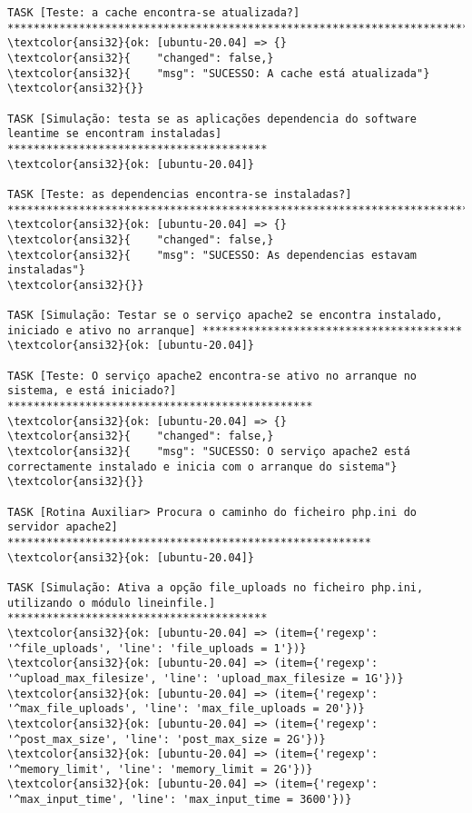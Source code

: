 \documentclass{scrartcl}
\begin{document}
\begin{Verbatim}
TASK [Teste: a cache encontra-se atualizada?] ********************************************************************************************
\textcolor{ansi32}{ok: [ubuntu-20.04] => {}
\textcolor{ansi32}{    "changed": false,}
\textcolor{ansi32}{    "msg": "SUCESSO: A cache está atualizada"}
\textcolor{ansi32}{}}

TASK [Simulação: testa se as aplicações dependencia do software leantime se encontram instaladas] ****************************************
\textcolor{ansi32}{ok: [ubuntu-20.04]}

TASK [Teste: as dependencias encontra-se instaladas?] ************************************************************************************
\textcolor{ansi32}{ok: [ubuntu-20.04] => {}
\textcolor{ansi32}{    "changed": false,}
\textcolor{ansi32}{    "msg": "SUCESSO: As dependencias estavam instaladas"}
\textcolor{ansi32}{}}

TASK [Simulação: Testar se o serviço apache2 se encontra instalado, iniciado e ativo no arranque] ****************************************
\textcolor{ansi32}{ok: [ubuntu-20.04]}

TASK [Teste: O serviço apache2 encontra-se ativo no arranque no sistema, e está iniciado?] ***********************************************
\textcolor{ansi32}{ok: [ubuntu-20.04] => {}
\textcolor{ansi32}{    "changed": false,}
\textcolor{ansi32}{    "msg": "SUCESSO: O serviço apache2 está correctamente instalado e inicia com o arranque do sistema"}
\textcolor{ansi32}{}}

TASK [Rotina Auxiliar> Procura o caminho do ficheiro php.ini do servidor apache2] ********************************************************
\textcolor{ansi32}{ok: [ubuntu-20.04]}

TASK [Simulação: Ativa a opção file_uploads no ficheiro php.ini, utilizando o módulo lineinfile.] ****************************************
\textcolor{ansi32}{ok: [ubuntu-20.04] => (item={'regexp': '^file_uploads', 'line': 'file_uploads = 1'})}
\textcolor{ansi32}{ok: [ubuntu-20.04] => (item={'regexp': '^upload_max_filesize', 'line': 'upload_max_filesize = 1G'})}
\textcolor{ansi32}{ok: [ubuntu-20.04] => (item={'regexp': '^max_file_uploads', 'line': 'max_file_uploads = 20'})}
\textcolor{ansi32}{ok: [ubuntu-20.04] => (item={'regexp': '^post_max_size', 'line': 'post_max_size = 2G'})}
\textcolor{ansi32}{ok: [ubuntu-20.04] => (item={'regexp': '^memory_limit', 'line': 'memory_limit = 2G'})}
\textcolor{ansi32}{ok: [ubuntu-20.04] => (item={'regexp': '^max_input_time', 'line': 'max_input_time = 3600'})}


\end{Verbatim}
\end{document}
